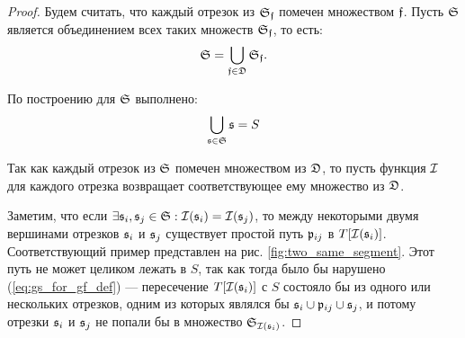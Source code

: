 \begin{proof}
Будем считать, что каждый отрезок из $\mathfrak{S}_{\mathfrak{f}}$ помечен множеством $\mathfrak{f}$. Пусть $\mathfrak{S}$ является объединением всех таких множеств $\mathfrak{S}_{\mathfrak{f}}$, то есть:
\begin{equation}
\mathfrak{S} = \bigcup_{\mathfrak{f} \in \mathfrak{D}} \mathfrak{S}_{\mathfrak{f}} \text{.}
\end{equation}

По построению для $\mathfrak{S}$ выполнено:
\begin{equation}
\bigcup_{\mathfrak{s} \in \mathfrak{S}} \mathfrak{s} = S
\end{equation}

Так как каждый отрезок из $\mathfrak{S}$ помечен множеством из $\mathfrak{D}$, то пусть функция $\mathcal{I}$ для каждого отрезка возвращает соответствующее ему множество из $\mathfrak{D}$.

Заметим, что если $\exists \mathfrak{s}_i, \mathfrak{s}_j \in \mathfrak{S}: \mathcal{I}(\mathfrak{s}_i) = \mathcal{I}(\mathfrak{s}_j)$, то между некоторыми двумя вершинами отрезков $\mathfrak{s}_i$ и $\mathfrak{s}_j$ существует простой путь $\mathfrak{p}_{ij}$ в $T[\mathcal{I}(\mathfrak{s}_i)]$. Соответствующий пример представлен на рис. \ref{fig:two_same_segment}. Этот путь не может целиком лежать в $S$, так как тогда было бы нарушено (\ref{eq:gs_for_gf_def}) --- пересечение $T[\mathcal{I}(\mathfrak{s}_i)]$ с $S$ состояло бы из одного или нескольких отрезков, одним из которых являлся бы $\mathfrak{s}_i \cup \mathfrak{p}_{ij} \cup \mathfrak{s}_j$, и потому отрезки $\mathfrak{s}_i$ и $\mathfrak{s}_j$ не попали бы в множество $\mathfrak{S}_{\mathcal{I}(\mathfrak{s}_i)}$.


\end{proof}
